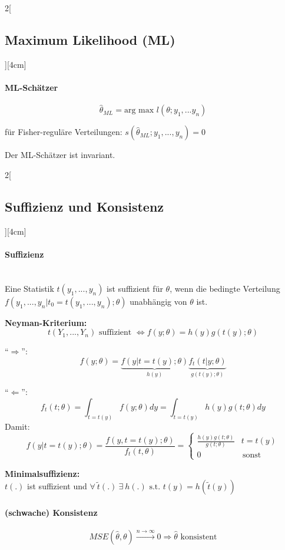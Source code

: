 \documentclass[8pt]{extarticle}
\begin{document}
\begin{multicols}{2}[\subsection{Maximum Likelihood (ML)}][4cm]
  \paragraph{ML-Schätzer}
   $$\hat{\theta}_{ML} = \text{arg max } l(\theta; y_1,...y_n)$$
   
   für Fisher-reguläre Verteilungen:
   $s\left(\hat{\theta}_{ML};y_1,...,y_n\right) = 0$
   
   Der ML-Schätzer ist invariant.
  

\end{multicols}


\begin{multicols}{2}[\subsection{Suffizienz und Konsistenz}][4cm]

\paragraph{Suffizienz} \ \\
\noindent Eine Statistik $t(y_1,...,y_n)$ ist suffizient für $\theta$, wenn die bedingte Verteilung $f(y_1,...,y_n|t_0 = t(y_1,...,y_n);\theta)$ unabhängig von $\theta$ ist. \vspace{0.5em}

\textbf{Neyman-Kriterium:}
$$t(Y_1,...,Y_n) \text{ suffizient } \Leftrightarrow f(y;\theta) = h(y)g\left(t(y);\theta\right)$$
\begin{Beweis}
``$\Rightarrow$'':
$$f(y;\theta) = \underbrace{f(y|t = t(y);\theta)}_{h(y)} \underbrace{f_t(t|y;\theta)}_{g(t(y);\theta)}$$

\noindent ``$\Leftarrow$'':
$$f_t(t;\theta) = \int_{t=t(y)} f(y;\theta)dy = \int_{t=t(y)} h(y) g(t;\theta)dy$$
\indent Damit:
$$f\left(y|t=t(y);\theta\right) = \frac{f(y,t=t(y);\theta)}{f_t(t,\theta)}
= \begin{cases}
\frac{h(y)g(t;\theta)}{g(t;\theta)} & t=t(y) \\
0 & \, \text{sonst}
\end{cases}$$
\end{Beweis}

\textbf{Minimalsuffizienz:} \ \\
$t(.)$ ist suffizient und $\forall\: \tilde{t}(.)\: \exists\: h(.) \text{ s.t. } t(y) = h(\tilde{t}(y))$

\paragraph{(schwache) Konsistenz}
$$MSE(\hat{\theta},\theta) \overset{n\rightarrow\infty}{\longrightarrow} 0 \Rightarrow \hat{\theta} \text{ konsistent}$$

\end{multicols}
\end{document}
